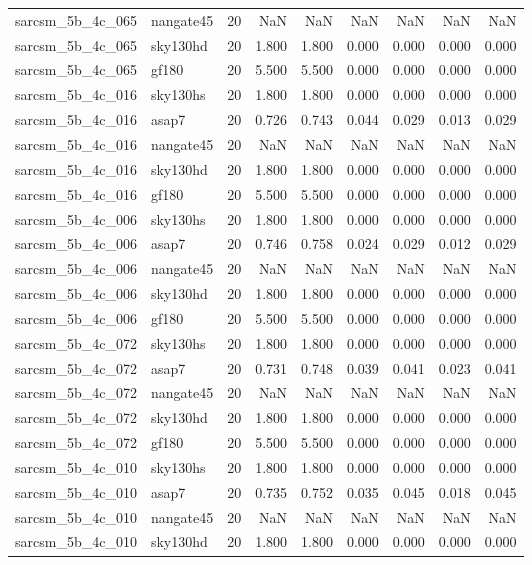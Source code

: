 \begin{tabular}{llrrrrrrr}
sarcsm\_5b\_4c\_065 & nangate45 & 20 & NaN & NaN & NaN & NaN & NaN & NaN \\
sarcsm\_5b\_4c\_065 & sky130hd & 20 & 1.800 & 1.800 & 0.000 & 0.000 & 0.000 & 0.000 \\
sarcsm\_5b\_4c\_065 & gf180 & 20 & 5.500 & 5.500 & 0.000 & 0.000 & 0.000 & 0.000 \\
sarcsm\_5b\_4c\_016 & sky130hs & 20 & 1.800 & 1.800 & 0.000 & 0.000 & 0.000 & 0.000 \\
sarcsm\_5b\_4c\_016 & asap7 & 20 & 0.726 & 0.743 & 0.044 & 0.029 & 0.013 & 0.029 \\
sarcsm\_5b\_4c\_016 & nangate45 & 20 & NaN & NaN & NaN & NaN & NaN & NaN \\
sarcsm\_5b\_4c\_016 & sky130hd & 20 & 1.800 & 1.800 & 0.000 & 0.000 & 0.000 & 0.000 \\
sarcsm\_5b\_4c\_016 & gf180 & 20 & 5.500 & 5.500 & 0.000 & 0.000 & 0.000 & 0.000 \\
sarcsm\_5b\_4c\_006 & sky130hs & 20 & 1.800 & 1.800 & 0.000 & 0.000 & 0.000 & 0.000 \\
sarcsm\_5b\_4c\_006 & asap7 & 20 & 0.746 & 0.758 & 0.024 & 0.029 & 0.012 & 0.029 \\
sarcsm\_5b\_4c\_006 & nangate45 & 20 & NaN & NaN & NaN & NaN & NaN & NaN \\
sarcsm\_5b\_4c\_006 & sky130hd & 20 & 1.800 & 1.800 & 0.000 & 0.000 & 0.000 & 0.000 \\
sarcsm\_5b\_4c\_006 & gf180 & 20 & 5.500 & 5.500 & 0.000 & 0.000 & 0.000 & 0.000 \\
sarcsm\_5b\_4c\_072 & sky130hs & 20 & 1.800 & 1.800 & 0.000 & 0.000 & 0.000 & 0.000 \\
sarcsm\_5b\_4c\_072 & asap7 & 20 & 0.731 & 0.748 & 0.039 & 0.041 & 0.023 & 0.041 \\
sarcsm\_5b\_4c\_072 & nangate45 & 20 & NaN & NaN & NaN & NaN & NaN & NaN \\
sarcsm\_5b\_4c\_072 & sky130hd & 20 & 1.800 & 1.800 & 0.000 & 0.000 & 0.000 & 0.000 \\
sarcsm\_5b\_4c\_072 & gf180 & 20 & 5.500 & 5.500 & 0.000 & 0.000 & 0.000 & 0.000 \\
sarcsm\_5b\_4c\_010 & sky130hs & 20 & 1.800 & 1.800 & 0.000 & 0.000 & 0.000 & 0.000 \\
sarcsm\_5b\_4c\_010 & asap7 & 20 & 0.735 & 0.752 & 0.035 & 0.045 & 0.018 & 0.045 \\
sarcsm\_5b\_4c\_010 & nangate45 & 20 & NaN & NaN & NaN & NaN & NaN & NaN \\
sarcsm\_5b\_4c\_010 & sky130hd & 20 & 1.800 & 1.800 & 0.000 & 0.000 & 0.000 & 0.000 \\

\end{tabular}
